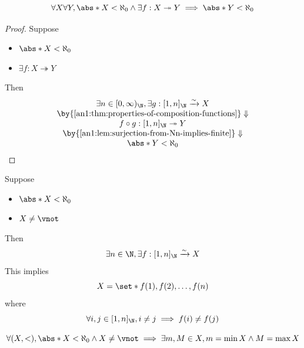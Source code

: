 \begin{theorem} \label{an1:thm:surjection-from-finite-set-implies-finite}
  \[
    \forall X \forall Y, \abs*{X} < \aleph_{0} \land \exists f: X \twoheadrightarrow Y
    \implies \abs*{Y} < \aleph_{0}
  \]
\end{theorem}

\begin{proof}
  Suppose
  \begin{itemize}
    \item $\abs*{X} < \aleph_{0}$
    \item $\exists f: X \twoheadrightarrow Y$
  \end{itemize}
  Then
  \[
    \begin{array}{c}
      \exists n \in [0, \infty)_{\N}, \exists g: [1, n]_{\N} \xrightarrow{\sim} X \\
      \by{\Cref{an1:thm:properties-of-composition-functions}} \Downarrow          \\
      f \circ g: [1, n]_{\N} \twoheadrightarrow Y                                 \\
      \by{\Cref{an1:lem:surjection-from-Nn-implies-finite}} \Downarrow            \\
      \abs*{Y} < \aleph_{0}
    \end{array}
  \]
\end{proof}

\begin{remark}
  Suppose
  \begin{itemize}
    \item $\abs*{X} < \aleph_{0}$
    \item $X \neq \vnot$
  \end{itemize}
  Then
  \[
    \exists n \in \N, \exists f: [1, n]_{\N} \xrightarrow{\sim} X
  \]
  This implies
  \[
    X = \set*{f(1), f(2), \dots, f(n)}
  \]
  where
  \[
    \forall i, j \in [1, n]_{\N}, i \neq j \implies f(i) \neq f(j)
  \]
\end{remark}

\begin{theorem} \label{an1:thm:finite-ordered-set-has-extremum}
  \[
    \forall (X, <), \abs*{X} < \aleph_{0} \land X \neq \vnot \implies \exists m, M \in X, m = \min X \land M = \max X
  \]
\end{theorem}

